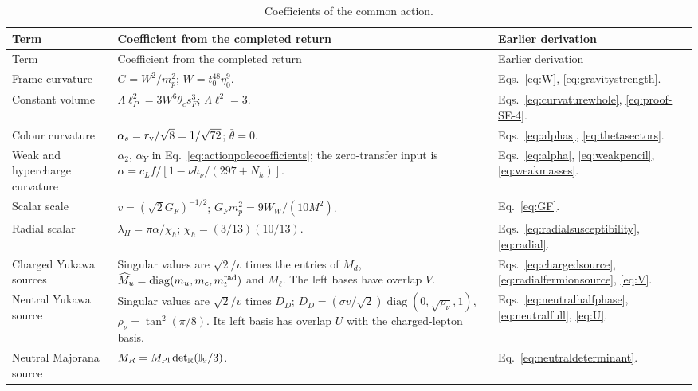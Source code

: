 \documentclass[aps,prx,onecolumn,10pt,notitlepage,nofootinbib,longbibliography]{revtex4-2}
\numberwithin{equation}{section}
\numberwithin{table}{section}
\newcommand{\Id}{\mathbb I}
\newcommand{\diag}{\operatorname{diag}}
\begin{document}
\begingroup\small
\setlength{\tabcolsep}{4pt}
\begin{longtable}{@{}>{\raggedright\arraybackslash}p{}
>{\raggedright\arraybackslash}p{}
>{\raggedright\arraybackslash}p{}@{}}
\caption{Coefficients of the common action.}\label{tab:actioncoefficients}\\
\toprule Term&Coefficient from the completed return&Earlier derivation\\\midrule
\endfirsthead
\toprule Term&Coefficient from the completed return&Earlier derivation\\\midrule
\endhead\bottomrule\endfoot
Frame curvature&$G=W^2/m_p^2$; $W=t_0^{48}\eta_0^9$.
&Eqs.~\eqref{eq:W}, \eqref{eq:gravitystrength}.\\[4pt]
Constant volume&$\Lambda\ell_P^2=3W^6\theta_cs_F^3$;
$\Lambda\ell^2=3$.
&Eqs.~\eqref{eq:curvaturewhole}, \eqref{eq:proof-SE-4}.\\[4pt]
Colour curvature&$\alpha_s=r_{\rm v}/\sqrt8=1/\sqrt{72}$;
$\bar\theta=0$.
&Eqs.~\eqref{eq:alphas}, \eqref{eq:thetasectors}.\\[4pt]
Weak and hypercharge curvature&$\alpha_2$, $\alpha_Y$ in
Eq.~\eqref{eq:actionpolecoefficients}; the zero-transfer input is
$\alpha=c_Lf/[1-\nu h_\nu/(297+N_h)]$.
&Eqs.~\eqref{eq:alpha}, \eqref{eq:weakpencil}, \eqref{eq:weakmasses}.\\[4pt]
Scalar scale&$v=(\sqrt2G_F)^{-1/2}$;
$G_Fm_p^2=9W_W/(10M^2)$.
&Eq.~\eqref{eq:GF}.\\[4pt]
Radial scalar&$\lambda_H=\pi\alpha/\chi_h$;
$\chi_h=(3/13)(10/13)$.
&Eqs.~\eqref{eq:radialsusceptibility}, \eqref{eq:radial}.\\[4pt]
Charged Yukawa sources&Singular values are $\sqrt2/v$ times the entries
of $M_d$, $\widehat M_u=\diag(m_u,m_c,m_t^{\rm rad})$ and $M_\ell$.
The left bases have overlap $V$.
&Eqs.~\eqref{eq:chargedsource}, \eqref{eq:radialfermionsource},
\eqref{eq:V}.\\[4pt]
Neutral Yukawa source&Singular values are $\sqrt2/v$ times $D_D$;
$D_D=(\sigma v/\sqrt2)\diag(0,\sqrt{\rho_\nu},1)$,
$\rho_\nu=\tan^2(\pi/8)$. Its left basis has overlap $U$ with the
charged-lepton basis.
&Eqs.~\eqref{eq:neutralhalfphase}, \eqref{eq:neutralfull},
\eqref{eq:U}.\\[4pt]
Neutral Majorana source&$M_R=M_{\rm Pl}\det_{\mathbb R}(\Id_9/3)$.
&Eq.~\eqref{eq:neutraldeterminant}.\\
\end{longtable}
\endgroup
\end{document}
